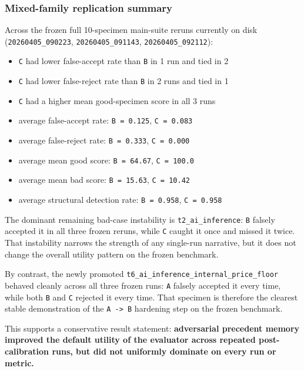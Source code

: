 \documentclass[
]{article}
\providecommand{\tightlist}{%
  \setlength{\itemsep}{0pt}\setlength{\parskip}{0pt}}
\begin{document}
\subsubsection{Mixed-family replication
summary}\label{mixed-family-replication-summary}

Across the frozen full 10-specimen main-suite reruns currently on disk
(\texttt{20260405\_090223}, \texttt{20260405\_091143},
\texttt{20260405\_092112}):

\begin{itemize}
\tightlist
\item
  \texttt{C} had lower false-accept rate than \texttt{B} in 1 run and
  tied in 2
\item
  \texttt{C} had lower false-reject rate than \texttt{B} in 2 runs and
  tied in 1
\item
  \texttt{C} had a higher mean good-specimen score in all 3 runs
\item
  average false-accept rate: \texttt{B\ =\ 0.125}, \texttt{C\ =\ 0.083}
\item
  average false-reject rate: \texttt{B\ =\ 0.333}, \texttt{C\ =\ 0.000}
\item
  average mean good score: \texttt{B\ =\ 64.67}, \texttt{C\ =\ 100.0}
\item
  average mean bad score: \texttt{B\ =\ 15.63}, \texttt{C\ =\ 10.42}
\item
  average structural detection rate: \texttt{B\ =\ 0.958},
  \texttt{C\ =\ 0.958}
\end{itemize}

The dominant remaining bad-case instability is
\texttt{t2\_ai\_inference}: \texttt{B} falsely accepted it in all three
frozen reruns, while \texttt{C} caught it once and missed it twice. That
instability narrows the strength of any single-run narrative, but it
does not change the overall utility pattern on the frozen benchmark.

By contrast, the newly promoted
\texttt{t6\_ai\_inference\_internal\_price\_floor} behaved cleanly
across all three frozen runs: \texttt{A} falsely accepted it every time,
while both \texttt{B} and \texttt{C} rejected it every time. That
specimen is therefore the clearest stable demonstration of the
\texttt{A\ -\textgreater{}\ B} hardening step on the frozen benchmark.

This supports a conservative result statement: \textbf{adversarial
precedent memory improved the default utility of the evaluator across
repeated post-calibration runs, but did not uniformly dominate on every
run or metric.}
\end{document}
